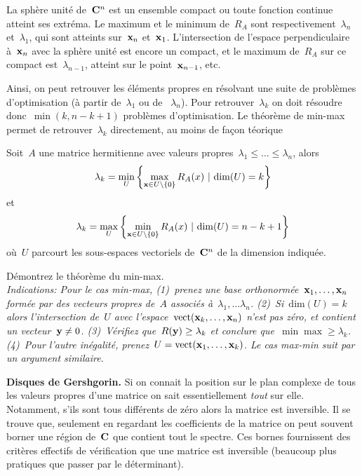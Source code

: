 \begin{proposition}
	La sphère unité de~$\mathbf{C}^n$ est un ensemble compact ou toute fonction
	continue atteint ses extréma.  Le maximum et le minimum de~$R_A$ sont
	respectivement~$\lambda_n$ et~$\lambda_1$, qui sont atteints sur~$\mathbf{x}_n$
	et~$\mathbf{x}_1$.  L'intersection de l'espace perpendiculaire à~$\mathbf{x}_n$ avec la
	sphère unité est encore un compact, et le maximum de~$R_A$ sur ce compact
	est~$\lambda_{n-1}$, atteint sur le point~$\mathbf{x}_{n-1}$, etc.
\end{proposition}

Ainsi, on peut retrouver les éléments propres en résolvant une suite de
problèmes d'optimisation (à partir de~$\lambda_1$ ou de ~$\lambda_n$).
Pour retrouver~$\lambda_k$ on doit résoudre donc~$\min(k,n-k+1)$ problèmes
d'optimisation.  Le théorème de min-max permet de retrouver~$\lambda_k$
directement, au moins de façon téorique

\begin{proposition}
	Soit~$A$ une matrice hermitienne avec valeurs
	propres~$\lambda_1\le\ldots\le\lambda_n$, alors
	\[
		\lambda_k = \min_U\left\{ \max_{\mathbf{x}\in U\setminus\{0\}} R_A(x) \ |\ \mathrm{dim}(U)=k\right\}
	\]
	et
	\[
		\lambda_k = \max_U\left\{ \min_{\x\in
		U\setminus\{0\}}R_A(x) \ |\ \mathrm{dim}(U)=n-k+1\right\}
	\]
	où~$U$ parcourt les sous-espaces vectoriels de~$\mathbf{C}^n$ de la dimension
	indiquée.
\end{proposition}

\begin{exercice}
	Démontrez le théorème du min-max.\\
	\emph{
		Indications: Pour le cas min-max, (1)~prenez une base
		orthonormée~$\mathbf{x}_1,\ldots,\mathbf{x}_n$ formée par des vecteurs propres de~$A$
		associés à~$\lambda_1,\ldots\lambda_n$.  (2)~Si~$\mathrm{dim}(U)=k$ alors
		l'intersection de~$U$ avec l'espace~$\mathrm{vect}(\mathbf{x}_k,\ldots,\mathbf{x}_n)$
		n'est pas zéro, et contient un vecteur~$\mathbf{y}\neq0$. (3)~Vérifiez
		que~$R(\mathbf{y})\ge\lambda_k$ et conclure que~$\min\max\ge\lambda_k$. (4)~Pour
		l'autre inégalité, prenez~$U=\mathrm{vect}(\mathbf{x}_1,\ldots,\mathbf{x}_k)$.  Le cas
		max-min suit par un argument similaire.
}
\end{exercice}



{\bf Disques de Gershgorin.}
Si on connait la position sur le plan complexe
de tous les valeurs propres d'une matrice on sait essentiellement \emph{tout}
sur elle.  Notamment, s'ils sont tous différents de zéro alors la matrice est
inversible.  Il se trouve que, seulement en regardant les coefficients de la
matrice on peut souvent borner une région de~$\mathbf{C}$ que contient tout le
spectre.  Ces bornes fournissent des critères effectifs de vérification que
une matrice est inversible (beaucoup plus pratiques que passer par le
déterminant).

